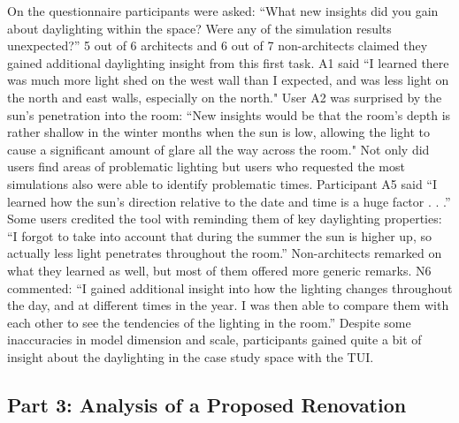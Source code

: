 \documentclass[preprint]{elsarticle}
\begin{document}
On the questionnaire participants were asked: ``What new insights did
you gain about daylighting within the space?  Were any of the
simulation results unexpected?''
%
5 out of 6 architects and 6 out of 7 non-architects claimed they
gained additional daylighting insight from this first task.  A1 said
``I learned there was much more light shed on the west wall than I
expected, and was less light on the north and east walls, especially
on the north."  User A2 was surprised by the sun's penetration into
the room: ``New insights would be that the room's depth is rather
shallow in the winter months when the sun is low, allowing the light
to cause a significant amount of glare all the way across the room."
Not only did users find areas of problematic lighting but users who
requested the most simulations also were able to identify problematic
times.  Participant A5 said ``I learned how the sun's direction
relative to the date and time is a huge factor . . .''
Some users credited the tool with reminding them
of key
daylighting properties:
``I forgot to take into account that during the
summer the sun is higher up, so actually less light penetrates
throughout the room.''  Non-architects remarked on what they learned
as well, but most of them offered more generic remarks.  N6 commented:
``I gained additional insight into how the lighting changes throughout
the day, and at different times in the year.  I was then able to
compare them with each other to see the tendencies of the lighting in
the room.''
%
Despite some inaccuracies in model dimension and scale, participants
gained quite a bit of insight about the daylighting in the case study
space with the TUI. 


\subsection{Part 3: Analysis of a Proposed Renovation}


\end{document}
